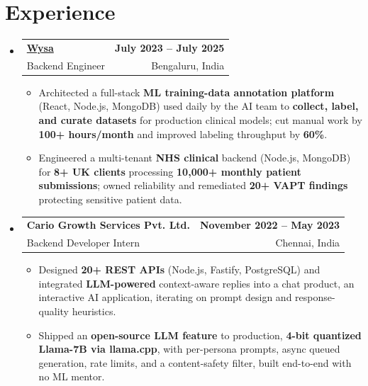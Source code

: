 \documentclass[letterpaper,10pt]{article}
\makeatletter
\newcommand{\resumeItem}[1]{
  \item\small{#1\vspace{-1pt}}
}
\newcommand{\resumeSubheading}[4]{
  \vspace{1pt}\item
    \begin{tabular*}{0.985\textwidth}[t]{l@{\extracolsep{\fill}}r}
      \textbf{#1} & \textbf{\small #2} \\
      {\small\color{ResumeSlate} #3} & {\small\color{ResumeSlate} #4} \\
    \end{tabular*}\vspace{-6pt}
}
\newcommand{\resumeSubHeadingListStart}{\begin{itemize}[leftmargin=0.0in, label={}, itemsep=2pt, topsep=2pt]}
\newcommand{\resumeSubHeadingListEnd}{\end{itemize}}
\newcommand{\resumeItemListStart}{\begin{itemize}[leftmargin=0.18in, itemsep=2pt, topsep=1pt]}
\newcommand{\resumeItemListEnd}{\end{itemize}\vspace{-4pt}}
\makeatother
\begin{document}
\section{Experience}
\resumeSubHeadingListStart
  \resumeSubheading
    {\href{https://www.wysa.io}{Wysa}}{July 2023 -- July 2025}
    {Backend Engineer}{Bengaluru, India}
    \resumeItemListStart
      \resumeItem{Architected a full-stack \textbf{ML training-data annotation platform} (React, Node.js, MongoDB) used daily by the AI team to \textbf{collect, label, and curate datasets} for production clinical models; cut manual work by \textbf{100+ hours/month} and improved labeling throughput by \textbf{60\%}.}
      \resumeItem{Engineered a multi-tenant \textbf{NHS clinical} backend (Node.js, MongoDB) for \textbf{8+ UK clients} processing \textbf{10{,}000+ monthly patient submissions}; owned reliability and remediated \textbf{20+ VAPT findings} protecting sensitive patient data.}
    \resumeItemListEnd
  \resumeSubheading
    {Cario Growth Services Pvt. Ltd.}{November 2022 -- May 2023}
    {Backend Developer Intern}{Chennai, India}
    \resumeItemListStart
      \resumeItem{Designed \textbf{20+ REST APIs} (Node.js, Fastify, PostgreSQL) and integrated \textbf{LLM-powered} context-aware replies into a chat product, an interactive AI application, iterating on prompt design and response-quality heuristics.}
      \resumeItem{Shipped an \textbf{open-source LLM feature} to production, \textbf{4-bit quantized Llama-7B via llama.cpp}, with per-persona prompts, async queued generation, rate limits, and a content-safety filter, built end-to-end with no ML mentor.}
    \resumeItemListEnd
\resumeSubHeadingListEnd
\vspace{-4pt}
\end{document}
